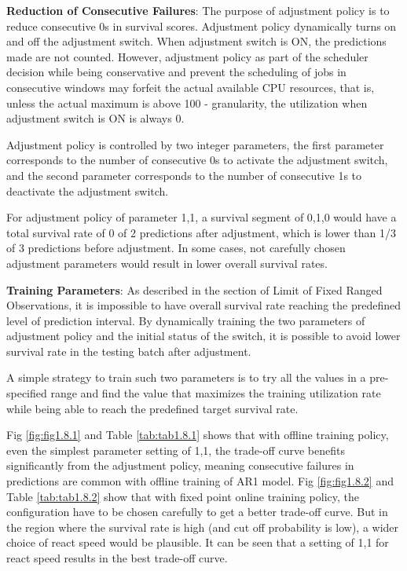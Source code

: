 \documentclass{article}
\begin{document}
\begin{flushleft}
\textbf{Reduction of Consecutive Failures}: The purpose of adjustment policy is
to reduce consecutive 0s in survival scores. Adjustment policy dynamically turns
on and off the adjustment switch. When adjustment switch is ON, the predictions
made are not counted. However, adjustment policy as part of the scheduler
decision while being conservative and prevent the scheduling of jobs in
consecutive windows may forfeit the actual available CPU resources, that is,
unless the actual maximum is above 100 - granularity, the utilization when
adjustment switch is ON is always 0.

Adjustment policy is controlled by two integer parameters, the first parameter
corresponds to the number of consecutive 0s to activate the adjustment switch,
and the second parameter corresponds to the number of consecutive 1s to
deactivate the adjustment switch.

For adjustment policy of parameter 1,1, a survival segment of 0,1,0 would have a
total survival rate of 0 of 2 predictions after adjustment, which is lower than
1/3 of 3 predictions before adjustment. In some cases, not carefully chosen
adjustment parameters would result in lower overall survival rates. 
\end{flushleft}

\begin{flushleft}
\textbf{Training Parameters}: As described in the section of Limit of Fixed
Ranged Observations, it is impossible to have overall survival rate reaching the
predefined level of prediction interval. By dynamically training the two
parameters of adjustment policy and the initial status of the switch, it is
possible to avoid lower survival rate in the testing batch after adjustment.

A simple strategy to train such two parameters is to try all the values in a
pre-specified range and find the value that maximizes the training utilization
rate while being able to reach the predefined target survival rate.
\end{flushleft}

\begin{flushleft}
Fig \ref{fig:fig1.8.1} and Table \ref{tab:tab1.8.1} shows that with offline
training policy, even the simplest parameter setting of 1,1, the trade-off curve
benefits significantly from the adjustment policy, meaning consecutive failures
in predictions are common with offline training of AR1 model. Fig
\ref{fig:fig1.8.2} and Table \ref{tab:tab1.8.2} show that with fixed point
online training policy, the configuration have to be chosen carefully to get a
better trade-off curve. But in the region where the survival rate is high (and
cut off probability is low), a wider choice of react speed would be plausible.
It can be seen that a setting of 1,1 for react speed results in the best
trade-off curve.
\end{flushleft}
\end{document}
